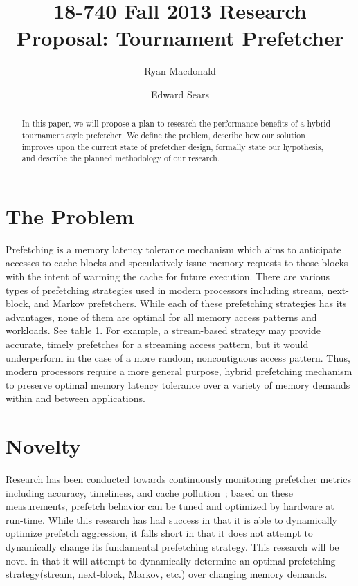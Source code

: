 \documentclass[pageno]{jpaper}
\begin{document}
\title{
18-740 Fall 2013 Research Proposal: Tournament Prefetcher}
\author{Ryan Macdonald \and Edward Sears}

\date{}
\maketitle

\thispagestyle{empty}

\begin{abstract}
In this paper, we will propose a plan to research the performance 
benefits of a hybrid tournament style prefetcher. We define the problem,
describe how our solution improves upon the current state of prefetcher
design, formally state our hypothesis, and describe the planned 
methodology of our research.
\end{abstract}

\section{The Problem}

Prefetching is a memory latency tolerance mechanism which aims to anticipate 
accesses to cache blocks and speculatively issue memory requests to those blocks with 
the intent of warming the cache for future execution. There are various types of prefetching 
strategies used in modern processors including stream, next-block, and Markov prefetchers. 
While each of these prefetching strategies has its advantages, none of them are optimal 
for all memory access patterns and workloads. See table 1. For example, a stream-based strategy may 
provide accurate, timely prefetches for a streaming access pattern, but it would underperform 
in the case of a more random, noncontiguous access pattern. Thus, modern processors require 
a more general purpose, hybrid prefetching mechanism to preserve optimal memory latency 
tolerance over a variety of memory demands within and between applications.


\section{Novelty}

Research has been conducted towards continuously monitoring prefetcher metrics including 
accuracy, timeliness, and cache pollution~\cite{srinath07}; based on these measurements, prefetch behavior 
can be tuned and optimized by hardware at run-time. While this research has had success 
in that it is able to dynamically optimize prefetch aggression, it falls short in that 
it does not attempt to dynamically change its fundamental prefetching strategy. This research 
will be novel in that it will attempt to dynamically determine an optimal prefetching 
strategy(stream, next-block, Markov, etc.) over changing memory demands. 
\end{document}
